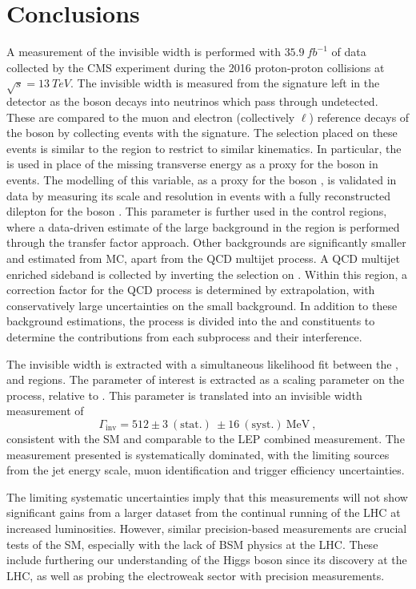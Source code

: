 \chapter{Conclusions}
\label{chap:summary}


A measurement of the \PZ invisible width is performed with $\SI{35.9}{fb^{-1}}$ of data collected by the CMS experiment during the 2016 proton-proton collisions at $\sqrt{s}=\SI{13}{TeV}$. The invisible width is measured from the \metplusjets signature left in the detector as the \PZ boson decays into neutrinos which pass through undetected. These are compared to the muon and electron (collectively $\ell$) reference decays of the \PZ boson by collecting events with the \diellplusjets signature. The selection placed on these events is similar to the \metplusjets region to restrict to similar kinematics. In particular, the \recoil is used in place of the missing transverse energy as a proxy for the boson \pt in \IVj events. The modelling of this variable, as a proxy for the boson \pt, is validated in data by measuring its scale and resolution in events with a fully reconstructed dilepton for the boson \pt. This parameter is further used in the \ellplusjets control regions, where a data-driven estimate of the large \IWlvj background in the \metplusjets region is performed through the transfer factor approach.  Other backgrounds are significantly smaller and estimated from MC, apart from the QCD multijet process. A QCD multijet enriched sideband is collected by inverting the selection on \mindphi. Within this region, a correction factor for the QCD process is determined by extrapolation, with conservatively large uncertainties on the small background. In addition to these background estimations, the \IDYll process is divided into the \IZll and \Igstarll constituents to determine the contributions from each subprocess and their interference.

The invisible width is extracted with a simultaneous likelihood fit between the \metplusjets, \ellplusjets and \diellplusjets regions. The parameter of interest is extracted as a scaling parameter on the \IZvvj process, relative to \IZllj.  This parameter is translated into an invisible width measurement of
%
\begin{equation}
    \Gamma_{\mathrm{inv}} = 512 \pm 3\ (\mathrm{stat.})\ \pm 16\ (\mathrm{syst.})\ \mathrm{MeV}\ ,
\end{equation}
%
consistent with the SM and comparable to the LEP combined measurement. The measurement presented is systematically dominated, with the limiting sources from the jet energy scale, muon identification and trigger efficiency uncertainties.

The limiting systematic uncertainties imply that this measurements will not show significant gains from a larger dataset from the continual running of the LHC at increased luminosities. However, similar precision-based measurements are crucial tests of the SM, especially with the lack of BSM physics at the LHC.  These include furthering our understanding of the Higgs boson since its discovery at the LHC, as well as probing the electroweak sector with precision measurements.
